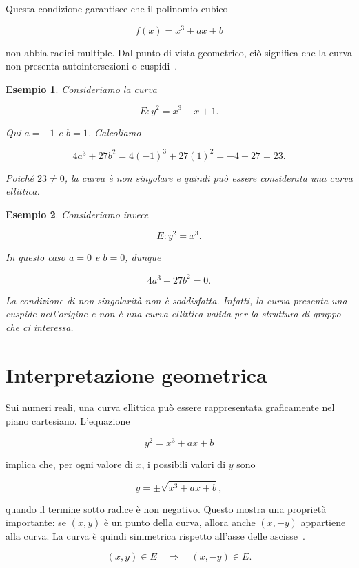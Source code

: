 \documentclass[12pt,a4paper,oneside]{report}
\newtheorem{example}{Esempio}[chapter]
\begin{document}
Questa condizione garantisce che il polinomio cubico

\begin{equation}
    f(x) = x^3 + ax + b
\end{equation}

non abbia radici multiple. Dal punto di vista geometrico, ciò significa che la curva non presenta autointersezioni o cuspidi~\cite{margara_ec}.

\begin{example}
Consideriamo la curva

\[
E: y^2 = x^3 - x + 1.
\]

Qui \(a=-1\) e \(b=1\). Calcoliamo

\[
4a^3 + 27b^2 = 4(-1)^3 + 27(1)^2 = -4 + 27 = 23.
\]

Poiché \(23 \neq 0\), la curva è non singolare e quindi può essere considerata una curva ellittica.
\end{example}

\begin{example}
Consideriamo invece

\[
E: y^2 = x^3.
\]

In questo caso \(a=0\) e \(b=0\), dunque

\[
4a^3 + 27b^2 = 0.
\]

La condizione di non singolarità non è soddisfatta. Infatti, la curva presenta una cuspide nell'origine e non è una curva ellittica valida per la struttura di gruppo che ci interessa.
\end{example}

\section{Interpretazione geometrica}

Sui numeri reali, una curva ellittica può essere rappresentata graficamente nel piano cartesiano. L'equazione

\[
y^2 = x^3 + ax + b
\]

implica che, per ogni valore di \(x\), i possibili valori di \(y\) sono

\[
y = \pm \sqrt{x^3 + ax + b},
\]

quando il termine sotto radice è non negativo. Questo mostra una proprietà importante: se \((x,y)\) è un punto della curva, allora anche \((x,-y)\) appartiene alla curva. La curva è quindi simmetrica rispetto all'asse delle ascisse~\cite{margara_ec}.

\begin{equation}
    (x,y) \in E \quad \Longrightarrow \quad (x,-y) \in E.
\end{equation}
\end{document}
